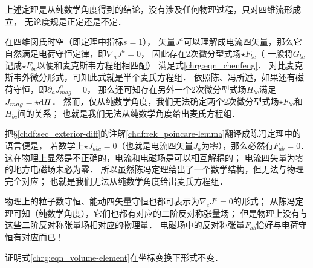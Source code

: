 \begin{remark}
	上述定理是从纯数学角度得到的结论，没有涉及任何物理过程，只对四维流形成立，
	无论度规是正定还是不定．
\end{remark}
\begin{remark}
	在四维闵氏时空（即定理中指标$s=1$），
	矢量$J^a$可以理解成电流四矢量，那么它自然满足电荷守恒定律，即$\nabla_a J^a=0$，
	因此存在2次微分型式场$\star {F_{bc}}$（
	一般将${G_{bc}}$记成$\star {F_{bc}}$以便和麦克斯韦方程组相匹配）
	满足式\eqref{chrg:eqn_chenfeng}．
	对比麦克斯韦外微分形式，可知此式就是半个麦氏方程组．
	依照陈、冯\cite{chen-feng1989-cn}所述，如果还有磁荷守恒，即$\partial_a J^a_{mag}=0$，
	那么还可知存在另外一个2次微分型式场$H_{bc}$满足$J_{mag} = \star {\rm d}H$．
	然而，仅从纯数学角度，我们无法确定两个2次微分型式场$\star F_{bc}$和$H_{bc}$间的关系；
	也就是我们无法从纯数学角度给出麦氏方程组．
\end{remark}
\begin{remark}
	把\S\ref{chdf:sec_exterior-diff}的注解\ref{chdf:rek_poincare-lemma}翻译成陈冯定理中的语言便是，
	若数学上$\star J_{abc}=0$（也就是电流四矢量$J_{a}$为零），那么必然有$F_{ab}=0$．
	这在物理上显然是不正确的，电流和电磁场是可以相互解耦的；
	电流四矢量为零的地方电磁场未必为零．
	所以虽然陈冯定理给出了一个数学结构，但无法与物理完全对应；
	也就是我们无法从纯数学角度给出麦氏方程组．
\end{remark}
\begin{remark}
	物理上的粒子数守恒、能动四矢量守恒也都可表示为$\nabla_e J^e=0$的形式；
	从陈冯定理可知（纯数学角度），它们也都有对应的二阶反对称张量场；
	但是物理上没有与这些二阶反对称张量场相对应的物理量．
	电磁场中的反对称张量$F_{ab}$恰好与电荷守恒有对应而已！
\end{remark}






\begin{exercise}
	证明式\eqref{chrg:eqn_volume-element}在坐标变换下形式不变．
\end{exercise}




